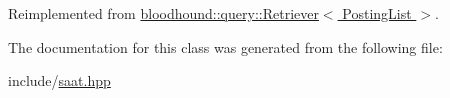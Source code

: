 Reimplemented from \hyperlink{classbloodhound_1_1query_1_1Retriever_a58da32a5139b980ba874f8b5e6bb89ec}{bloodhound\+::query\+::\+Retriever$<$ Posting\+List $>$}.



The documentation for this class was generated from the following file\+:\begin{DoxyCompactItemize}
\item 
include/\hyperlink{saat_8hpp}{saat.\+hpp}\end{DoxyCompactItemize}
